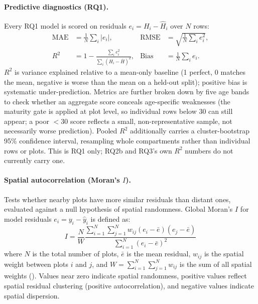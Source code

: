 \paragraph*{Predictive diagnostics (RQ1).}
Every RQ1 model is scored on residuals $e_i = H_i - \hat H_i$ over $N$ rows:
\begin{align*}
\text{MAE} &= \frac{1}{N}\sum_i |e_i|, &
\text{RMSE} &= \sqrt{\frac{1}{N}\sum_i e_i^2}, \\
R^2 &= 1 - \frac{\sum_i e_i^2}{\sum_i (H_i - \bar H)^2}, &
\text{Bias} &= \frac{1}{N}\sum_i e_i.
\end{align*}
$R^2$ is variance explained relative to a mean-only baseline (1 perfect, 0 matches the mean,
negative is worse than the mean on a held-out split); positive bias is systematic
under-prediction. Metrics are further broken down by five age bands to check whether an
aggregate score conceals age-specific weaknesses (the maturity gate is applied at plot level, so
individual rows below 30 can still appear; a poor $<30$ score reflects a small, non-representative
sample, not necessarily worse prediction). Pooled $R^2$ additionally carries a cluster-bootstrap
95\% confidence interval, resampling whole compartments rather than individual rows or plots. This
is RQ1 only; RQ2b and RQ3's own $R^2$ numbers do not currently carry one.


\paragraph*{Spatial autocorrelation (Moran's $I$).}
Tests whether nearby plots have more similar residuals than distant ones, evaluated against a null hypothesis of spatial randomness. Global Moran's $I$ for model residuals $e_i = y_i - \hat{y}_i$ is defined as:
\begin{equation}
    I = \frac{N}{W} \frac{\sum_{i=1}^{N} \sum_{j=1}^{N} w_{ij} (e_i - \bar{e})(e_j - \bar{e})}{\sum_{i=1}^{N} (e_i - \bar{e})^2}
    \label{eq:morans_i}
\end{equation}
where $N$ is the total number of plots, $\bar{e}$ is the mean residual, $w_{ij}$ is the spatial weight between plots $i$ and $j$, and $W = \sum_{i=1}^N \sum_{j=1}^N w_{ij}$ is the sum of all spatial weights (). Values near zero indicate spatial randomness, positive values reflect spatial residual clustering (positive autocorrelation), and negative values indicate spatial dispersion.

